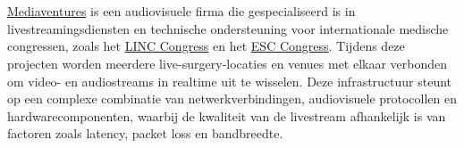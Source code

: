 
%
%
%
%
%

%



\chapter*{}

\href{https://mediaventures.be/}{Mediaventures} is een audiovisuele firma die gespecialiseerd is in livestreamingsdiensten en technische ondersteuning voor internationale medische congressen, zoals het \href{https://www.linkforwoundhealing.info/en/events/2025/link-for-wound-healing-congress-2025}{LINC Congress} en het \href{https://www.escardio.org/Congresses-Events/ESC-Congress}{ESC Congress}. Tijdens deze projecten worden meerdere live-surgery-locaties en venues met elkaar verbonden om video- en audiostreams in realtime uit te wisselen. Deze infrastructuur steunt op een complexe combinatie van netwerkverbindingen, audiovisuele protocollen en hardwarecomponenten, waarbij de kwaliteit van de livestream afhankelijk is van factoren zoals latency, packet loss en bandbreedte.


